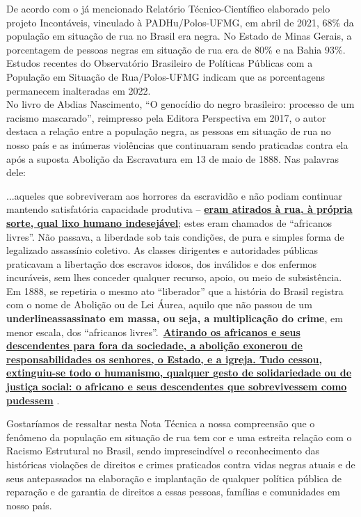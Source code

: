 \documentclass[14pt]{extarticle}
\begin{document}
De acordo com o já mencionado Relatório Técnico-Científico elaborado pelo projeto Incontáveis, vinculado à PADHu/Polos-UFMG, em abril de 2021, 68\% da população em situação de rua no Brasil era negra. No Estado de Minas Gerais, a porcentagem de pessoas negras em situação de rua era de 80\% e na Bahia 93\%. Estudos recentes do Observatório Brasileiro de Políticas Públicas com a População em Situação de Rua/Polos-UFMG indicam que as porcentagens permanecem inalteradas em 2022.\\

No livro de Abdias Nascimento, ``O genocídio do negro brasileiro: processo de um racismo mascarado”, reimpresso pela Editora Perspectiva em 2017, o autor destaca a relação entre a população negra, as pessoas em situação de rua no nosso país e as inúmeras violências que continuaram sendo praticadas contra ela após a suposta Abolição da Escravatura em 13 de maio de 1888. Nas palavras dele:

\vspace{-0.5cm}
\begin{trivlist}\leftskip=4cm
\begin{singlespace}
\item\small...aqueles que sobreviveram aos horrores da escravidão e não podiam continuar mantendo satisfatória capacidade produtiva – \textbf{\ul{eram atirados à rua, à própria sorte, qual lixo humano indesejável}}; estes eram chamados de ``africanos livres”. Não passava, a liberdade sob tais condições, de pura e simples forma de legalizado assassínio coletivo. As classes dirigentes e autoridades públicas praticavam a libertação dos escravos idosos, dos inválidos e dos enfermos incuráveis, sem lhes conceder qualquer recurso, apoio, ou meio de subsistência. Em 1888, se repetiria o mesmo ato ``liberador” que a história do Brasil registra com o nome de Abolição ou de Lei Áurea, aquilo que não passou de um \textbf{underline{assassinato em massa, ou seja, a multiplicação do crime}}, em menor escala, dos ``africanos livres”.\  \textbf{\ul{Atirando os africanos e seus descendentes para fora da sociedade, a abolição exonerou de responsabilidades os senhores, o Estado, e a igreja. Tudo cessou, extinguiu-se todo o humanismo, qualquer gesto de solidariedade ou de justiça social: o africano e seus descendentes que sobrevivessem como pudessem}} \citep[p. 79 - grifos nossos]{abdias}.
\end{singlespace}
\end{trivlist}


Gostaríamos de ressaltar nesta Nota Técnica a nossa compreensão que o fenômeno da população em situação de rua tem cor e uma estreita relação com o Racismo Estrutural no Brasil, sendo imprescindível o reconhecimento das históricas violações de direitos e crimes praticados contra vidas negras atuais e de seus antepassados na elaboração e implantação de qualquer política pública de reparação e de garantia de direitos a essas pessoas, famílias e comunidades em nosso país.\\
\end{document}
